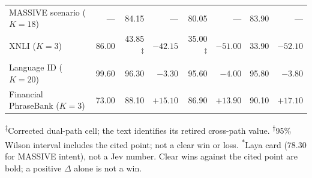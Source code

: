\begin{table}[htbp]
\begin{tabular}{@{}lrrrrrrr@{}}
MASSIVE scenario ($K=18$) & --- & 84.15 & --- & 80.05 & --- & 83.90 & --- \\
XNLI ($K=3$) & 86.00 & 43.85\textsuperscript{\(\ddagger\)} & $-42.15$ & 35.00\textsuperscript{\(\ddagger\)} & $-51.00$ & 33.90 & $-52.10$ \\
Language ID ($K=20$) & 99.60 & 96.30 & $-3.30$ & 95.60 & $-4.00$ & 95.80 & $-3.80$ \\
Financial PhraseBank ($K=3$) & 73.00 & 88.10 & \textbf{$+15.10$} & 86.90 & \textbf{$+13.90$} & 90.10 & \textbf{$+17.10$} \\
\bottomrule
\end{tabular}
\par\smallskip
\footnotesize
\textsuperscript{\(\ddagger\)}Corrected dual-path cell; the text identifies its
retired cross-path value.
\quad
\textsuperscript{\(\dagger\)}95\% Wilson interval includes the cited point; not
a clear win or loss.
\quad
\textsuperscript{\(\ast\)}Laya card (78.30 for
MASSIVE intent), not a Jev number.
\quad
Clear wins against the cited point are bold; a positive $\Delta$ alone is not a win.
\end{table}
